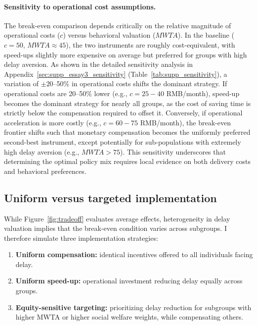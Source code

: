 \documentclass[doublespacing]{utdthesis}
\begin{document}
\paragraph{Sensitivity to operational cost assumptions.}
The break-even comparison depends critically on the relative magnitude of operational costs ($c$) versus behavioral valuation ($MWTA$). In the baseline ($c=50$, $MWTA \approx 45$), the two instruments are roughly cost-equivalent, with speed-ups slightly more expensive on average but preferred for groups with high delay aversion. As shown in the detailed sensitivity analysis in Appendix~\ref{sec:supp_essay3_sensitivity} (Table~\ref{tab:supp_sensitivity}), a variation of $\pm 20$--50\% in operational costs shifts the dominant strategy. If operational costs are 20--50\% lower (e.g., $c=25-40$ RMB/month), speed-up becomes the dominant strategy for nearly all groups, as the cost of saving time is strictly below the compensation required to offset it. Conversely, if operational acceleration is more costly (e.g., $c=60-75$ RMB/month), the break-even frontier shifts such that monetary compensation becomes the uniformly preferred second-best instrument, except potentially for sub-populations with extremely high delay aversion (e.g., $MWTA > 75$). This sensitivity underscores that determining the optimal policy mix requires local evidence on both delivery costs and behavioral preferences.

\clearpage

\subsection{Uniform versus targeted implementation}
\label{subsec:essay3_uniform_targeted}

While Figure~\ref{fig:tradeoff} evaluates average effects, heterogeneity in delay valuation implies that the break-even condition varies across subgroups. I therefore simulate three implementation strategies:

\begin{enumerate}
\item \textbf{Uniform compensation:} identical incentives offered to all individuals facing delay.
\item \textbf{Uniform speed-up:} operational investment reducing delay equally across groups.
\item \textbf{Equity-sensitive targeting:} prioritizing delay reduction for subgroups with higher MWTA or higher social welfare weights, while compensating others.
\end{enumerate}
\end{document}
